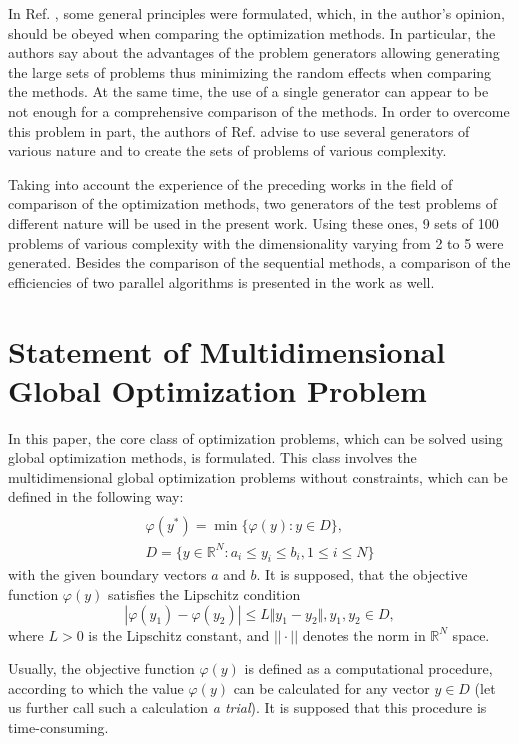 \documentclass{svproc}
\begin{document}
In Ref. \cite{Beiranvand2017}, some general principles were formulated, which, in the author's
opinion, should be obeyed when comparing the optimization methods. In particular, the authors say
about the advantages of the problem generators allowing generating the large sets of problems thus
minimizing the random effects when comparing the methods. At the same time, the use of a single
generator can appear to be not enough for a comprehensive comparison of the methods. In order to
overcome this problem in part, the authors of Ref. \cite{Beiranvand2017} advise to use several
generators of various nature and to create the sets of problems of various complexity.

Taking into account the experience of the preceding works in the field of comparison of the
optimization methods, two generators of the test problems of different nature will be used in the
present work. Using these ones, 9 sets of 100 problems of various complexity with the
dimensionality varying from 2 to 5 were generated. Besides the comparison of the sequential
methods, a comparison of the efficiencies of two parallel algorithms is presented in the work as well.

\section{Statement of Multidimensional Global Optimization Problem}
In this paper, the core class of optimization problems, which can be solved using
global optimization methods, is formulated. This class involves the multidimensional global
optimization problems without constraints, which can be defined in the following way:
\begin{equation}
\label{eq:task}
\begin{array}{cr}\\
  \varphi(y^*)=\min\{\varphi(y):y\in D\}, \\
  D=\{y\in \mathbb{R}^N:a_i\leq y_i\leq{b_i}, 1\leq{i}\leq{N}\}
\end{array}
\end{equation}
with the given boundary vectors  $a$ and  $b$. It is supposed, that the objective function
\(\varphi(y)\) satisfies the Lipschitz condition
\begin{equation}
\label{eq:lip}
|\varphi(y_1)-\varphi(y_2)|\leq L\Vert y_1-y_2\Vert,y_1,y_2\in D,
\end{equation}
where \(L>0\) is the Lipschitz constant, and \(||\cdot||\) denotes the norm in \(\mathbb{R}^N\)
space.
\par
Usually, the objective function \(\varphi(y)\) is defined as a computational procedure,
according to which the value \(\varphi(y)\) can be calculated for any vector \(y\in D\)
(let us further call such a calculation \textit{a trial}). It is supposed that this procedure
is time-consuming.
\end{document}
